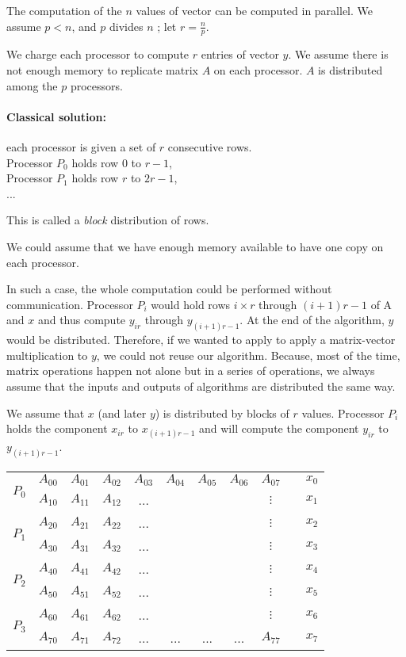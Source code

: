 The computation of the $n$ values of vector can be computed in parallel. We assume $p<n$, and $p$ divides $n$ ; let $r=\frac{n}{p}$.

We charge each processor to compute $r$ entries of vector $y$. We assume there is not enough memory to replicate matrix $A$ on each processor. $A$ is distributed among the $p$ processors.

\paragraph{Classical solution:} each processor is given a set of $r$ consecutive rows.\\
Processor $P_0$ holds row 0 to $r-1$,\\
Processor $P_1$ holds row $r$ to $2r-1$,\\
...

This is called a \emph{block} distribution of rows.

We could assume that we have enough memory available to have one copy on each processor.

In such a case, the whole computation could be performed without communication. Processor $P_i$ would hold rows $i \times r$ through $(i+1)r-1$ of A and $x$ and thus compute $y_{ir}$ through $y_{(i+1)r-1}$. At the end of the algorithm, $y$ would be distributed. Therefore, if we wanted to apply to apply a matrix-vector multiplication to $y$, we could not reuse our algorithm. Because, most of the time, matrix operations happen not alone but in a series of operations, we always assume that the inputs and outputs of algorithms are distributed the same way.

We assume that $x$ (and later $y$) is distributed by blocks of $r$ values. Processor $P_i$ holds the component $x_{ir}$ to $x_{(i+1)r-1}$ and will compute the component $y_{ir}$ to $y_{(i+1)r-1}$.

\begin{center}
\begin{tabular}{ c c c c c c c c c c c }
 \multirow{2}{*}{$P_0$} 
& $A_{00}$ & $A_{01}$ & $A_{02}$ & $A_{03}$ & $A_{04}$ & $A_{05}$ & $A_{06}$ & $A_{07}$ & & $x_0$ \\
&  $A_{10}$ & $A_{11}$ & $A_{12}$ & ... & & & & $\vdots$ & & $x_1$\\
\hline
 \multirow{2}{*}{$P_1$} 
& $A_{20}$ & $A_{21}$ & $A_{22}$ & ... & & & & $\vdots$ & & $x_2$\\
&  $A_{30}$ & $A_{31}$ & $A_{32}$ & ... & & & & $\vdots$ & & $x_3$\\
\hline
 \multirow{2}{*}{$P_2$} 
& $A_{40}$ & $A_{41}$ & $A_{42}$ & ... & & & & $\vdots$ &  & $x_4$\\
&  $A_{50}$ & $A_{51}$ & $A_{52}$ & ... & & & & $\vdots$ & & $x_5$\\
\hline
 \multirow{2}{*}{$P_3$} 
& $A_{60}$ & $A_{61}$ & $A_{62}$ & ... & & & & $\vdots$ & & $x_6$\\
&  $A_{70}$ & $A_{71}$ & $A_{72}$ & ... & ... & ... & ... & $A_{77}$ & & $x_7$
\end{tabular}

\end{center}

